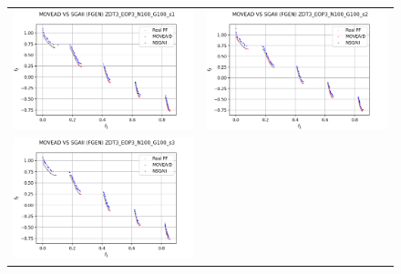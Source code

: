 \begin{figure}[H]
    \centering
    \begin{tabular}{c c}
    \includegraphics[scale=0.5]{figures/ZDT3_EOP3_N100_G100_T15/s1_comp.png} &
    \includegraphics[scale=0.5]{figures/ZDT3_EOP3_N100_G100_T15/s2_comp.png}\\
    \includegraphics[scale=0.5]{figures/ZDT3_EOP3_N100_G100_T15/s3_comp.png} &

\end{tabular}
\end{figure}
